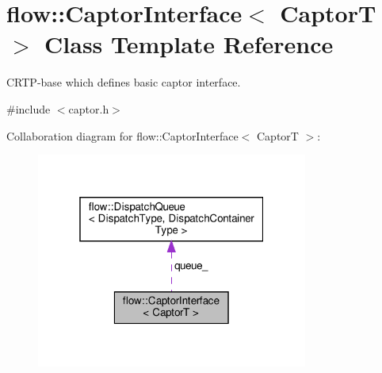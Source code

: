 \hypertarget{classflow_1_1_captor_interface}{}\section{flow\+:\+:Captor\+Interface$<$ CaptorT $>$ Class Template Reference}
\label{classflow_1_1_captor_interface}


C\+R\+T\+P-\/base which defines basic captor interface.  




{\ttfamily \#include $<$captor.\+h$>$}



Collaboration diagram for flow\+:\+:Captor\+Interface$<$ CaptorT $>$\+:\nopagebreak
\begin{figure}[H]
\begin{center}
\leavevmode
\includegraphics[width=253pt]{classflow_1_1_captor_interface__coll__graph}
\end{center}
\end{figure}
